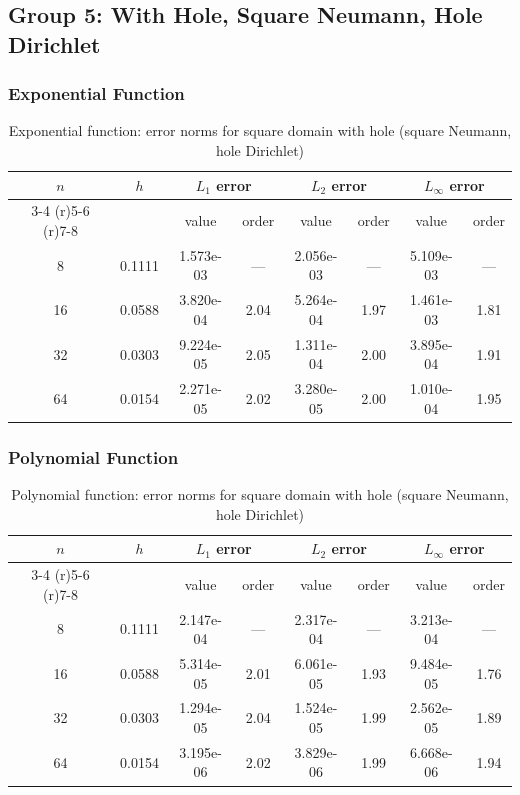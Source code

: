\documentclass[12pt,a4paper]{article}
\begin{document}
\subsection{Group 5: With Hole, Square Neumann, Hole Dirichlet}

\subsubsection{Exponential Function}
\begin{table}[H]
\centering
\caption{Exponential function: error norms for square domain with hole (square Neumann, hole Dirichlet)}
\begin{tabular}{cccccccc}
\toprule
$n$ & $h$ & \multicolumn{2}{c}{$L_1$ error} & \multicolumn{2}{c}{$L_2$ error} & \multicolumn{2}{c}{$L_\infty$ error} \\
\cmidrule(r){3-4} \cmidrule(r){5-6} \cmidrule(r){7-8}
& & value & order & value & order & value & order \\
\midrule
8  & 0.1111 & 1.573e-03 & --- & 2.056e-03 & --- & 5.109e-03 & --- \\
16 & 0.0588 & 3.820e-04 & 2.04 & 5.264e-04 & 1.97 & 1.461e-03 & 1.81 \\
32 & 0.0303 & 9.224e-05 & 2.05 & 1.311e-04 & 2.00 & 3.895e-04 & 1.91 \\
64 & 0.0154 & 2.271e-05 & 2.02 & 3.280e-05 & 2.00 & 1.010e-04 & 1.95 \\
\bottomrule
\end{tabular}
\end{table}

\subsubsection{Polynomial Function}
\begin{table}[H]
\centering
\caption{Polynomial function: error norms for square domain with hole (square Neumann, hole Dirichlet)}
\begin{tabular}{cccccccc}
\toprule
$n$ & $h$ & \multicolumn{2}{c}{$L_1$ error} & \multicolumn{2}{c}{$L_2$ error} & \multicolumn{2}{c}{$L_\infty$ error} \\
\cmidrule(r){3-4} \cmidrule(r){5-6} \cmidrule(r){7-8}
& & value & order & value & order & value & order \\
\midrule
8  & 0.1111 & 2.147e-04 & --- & 2.317e-04 & --- & 3.213e-04 & --- \\
16 & 0.0588 & 5.314e-05 & 2.01 & 6.061e-05 & 1.93 & 9.484e-05 & 1.76 \\
32 & 0.0303 & 1.294e-05 & 2.04 & 1.524e-05 & 1.99 & 2.562e-05 & 1.89 \\
64 & 0.0154 & 3.195e-06 & 2.02 & 3.829e-06 & 1.99 & 6.668e-06 & 1.94 \\
\bottomrule
\end{tabular}
\end{table}
\end{document}
